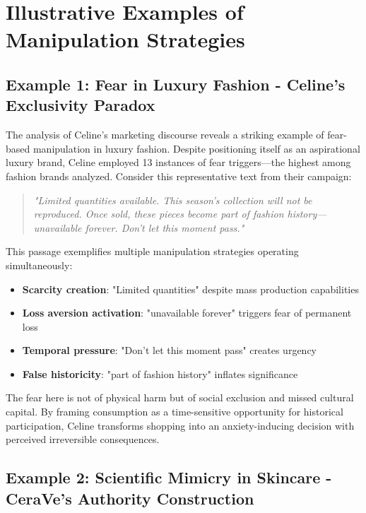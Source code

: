 
\section{Illustrative Examples of Manipulation Strategies}
\label{sec:examples}

\subsection{Example 1: Fear in Luxury Fashion - Celine's Exclusivity Paradox}

The analysis of Celine's marketing discourse reveals a striking example of fear-based manipulation in luxury fashion. Despite positioning itself as an aspirational luxury brand, Celine employed 13 instances of fear triggers—the highest among fashion brands analyzed. Consider this representative text from their campaign:

\begin{quote}
\textit{"Limited quantities available. This season's collection will not be reproduced. Once sold, these pieces become part of fashion history—unavailable forever. Don't let this moment pass."}
\end{quote}

This passage exemplifies multiple manipulation strategies operating simultaneously:
\begin{itemize}
\item \textbf{Scarcity creation}: "Limited quantities" despite mass production capabilities
\item \textbf{Loss aversion activation}: "unavailable forever" triggers fear of permanent loss
\item \textbf{Temporal pressure}: "Don't let this moment pass" creates urgency
\item \textbf{False historicity}: "part of fashion history" inflates significance
\end{itemize}

The fear here is not of physical harm but of social exclusion and missed cultural capital. By framing consumption as a time-sensitive opportunity for historical participation, Celine transforms shopping into an anxiety-inducing decision with perceived irreversible consequences.

\subsection{Example 2: Scientific Mimicry in Skincare - CeraVe's Authority Construction}

